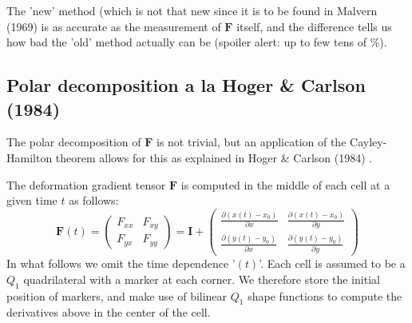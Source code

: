The 'new' method (which is not that new since it is to be found in Malvern (1969) \cite{malvern} 
is as accurate as the measurement of ${\bm F}$ itself, and the difference tells us how bad 
the 'old' method actually can be (spoiler alert: up to few tens of \%).




 

\newpage
\subsection*{Polar decomposition a la Hoger \& Carlson (1984)}

The polar decomposition of ${\bm F}$ is not trivial, but an 
application of the Cayley-Hamilton theorem allows for this 
as explained in Hoger \& Carlson (1984) \cite{hoca84}.

The deformation gradient tensor ${\bm F}$ is computed in the middle of
each cell at a given time $t$ as follows:
\[
{\bm F}(t)
=
\left(
\begin{array}{cc}
F_{xx} & F_{xy} \\
F_{yx} & F_{yy} 
\end{array}
\right)
=
{\bm I}+
\left(
\begin{array}{cc}
\frac{\partial (x(t)-x_0)}{\partial x}  & \frac{\partial (x(t)-x_0)}{\partial y}  \\
\frac{\partial (y(t)-y_0)}{\partial x}  & \frac{\partial (y(t)-y_0)}{\partial y}  
\end{array}
\right)
\]
In what follows we omit the time dependence '$(t)$'.
Each cell is assumed to be a $Q_1$ quadrilateral with a marker at each corner. We therefore store the 
initial position of markers, and make use of bilinear $Q_1$ shape functions to compute the derivatives
above in the center of the cell.

